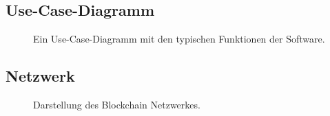 \documentclass[parskip=full,11pt,twoside]{scrartcl}
\begin{document}
\subsection{Use-Case-Diagramm}
\begin{figure}[H]
	\caption{\label{fig:usecase}
		Ein Use-Case-Diagramm mit den typischen Funktionen der Software.
	}
\end{figure}

\subsection{Netzwerk}
\begin{figure}[H]
	\caption{\label{fig:network}
		Darstellung des Blockchain Netzwerkes.
	}
\end{figure}
\end{document}
